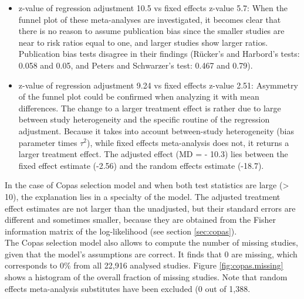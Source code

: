 \documentclass[11pt,a4paper,twoside]{book}\usepackage[]{graphicx}\usepackage[]{color}
\begin{document}
\begin{itemize}
\item z-value of regression adjustment 10.5 vs fixed effects z-value 5.7: When the funnel plot of these meta-analyses are investigated, it becomes clear that there is no reason to assume publication bias since the smaller studies are near to risk ratios equal to one, and larger studies show larger ratios. Publication bias tests disagree in their findings (R\"ucker's and Harbord's tests: 0.058 and 0.05, and Peters and Schwarzer's test: 0.467 and 0.79).
\item z-value of regression adjustment 9.24 vs fixed effects z-value 2.51: Asymmetry of the funnel plot could be confirmed when analyzing it with mean differences. The change to a larger treatment effect is rather due to large between study heterogeneity and the specific routine of the regression adjustment. Because it takes into account between-study heterogeneity (bias parameter times $\tau^2$), while fixed effects meta-analysis does not, it returns a larger treatment effect. The adjusted effect (MD = - 10.3) lies between the fixed effect estimate (-2.56) and the random effects estimate (-18.7).
\end{itemize}
In the case of Copas selection model and when both test statistics are large (> 10), the explanation lies in a specialty of the model. The adjusted treatment effect estimates are not larger than the unadjusted, but their standard errors are different and sometimes smaller, because they are obtained from the Fisher information matrix of the log-likelihood (see section \ref{sec:copas}). \\
The Copas selection model also allows to compute the number of missing studies, given that the model's assumptions are correct. It finds that 0 are missing, which corresponds to 0\% from all 22,916 analysed studies. Figure \ref{fig:copas.missing} shows a histogram of the overall fraction of missing studies. Note that random effects meta-analysis substitutes have been excluded (0 out of 1,388.
\end{document}
